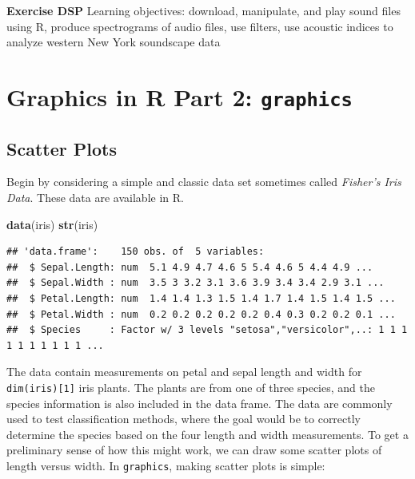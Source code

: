 \documentclass[
]{krantz}
\newenvironment{Shaded}{\begin{snugshade}}{\end{snugshade}}
\newcommand{\DataTypeTok}[1]{\textcolor[rgb]{0.13,0.29,0.53}{#1}}
\newcommand{\KeywordTok}[1]{\textcolor[rgb]{0.13,0.29,0.53}{\textbf{#1}}}
\newcommand{\NormalTok}[1]{#1}
\newcommand{\OperatorTok}[1]{\textcolor[rgb]{0.81,0.36,0.00}{\textbf{#1}}}
\begin{document}
\textbf{Exercise DSP} Learning objectives: download, manipulate, and play sound files using R, produce spectrograms of audio files, use filters, use acoustic indices to analyze western New York soundscape data

\hypertarget{graphics}{%
\chapter{\texorpdfstring{Graphics in R Part 2: \texttt{graphics}}{Graphics in R Part 2: graphics}}\label{graphics}}

\hypertarget{graphics1}{%
\section{Scatter Plots}\label{graphics1}}

Begin by considering a simple and classic data set sometimes called \emph{Fisher's Iris Data}. These data are available in R.

\begin{Shaded}
\begin{Highlighting}[]
\KeywordTok{data}\NormalTok{(iris)}
\KeywordTok{str}\NormalTok{(iris)}
\end{Highlighting}
\end{Shaded}

\begin{verbatim}
## 'data.frame':    150 obs. of  5 variables:
##  $ Sepal.Length: num  5.1 4.9 4.7 4.6 5 5.4 4.6 5 4.4 4.9 ...
##  $ Sepal.Width : num  3.5 3 3.2 3.1 3.6 3.9 3.4 3.4 2.9 3.1 ...
##  $ Petal.Length: num  1.4 1.4 1.3 1.5 1.4 1.7 1.4 1.5 1.4 1.5 ...
##  $ Petal.Width : num  0.2 0.2 0.2 0.2 0.2 0.4 0.3 0.2 0.2 0.1 ...
##  $ Species     : Factor w/ 3 levels "setosa","versicolor",..: 1 1 1 1 1 1 1 1 1 1 ...
\end{verbatim}

The data contain measurements on petal and sepal length and width for \texttt{dim(iris){[}1{]}} iris plants. The plants are from one of three species, and the species information is also included in the data frame. The data are commonly used to test classification methods, where the goal would be to correctly determine the species based on the four length and width measurements. To get a preliminary sense of how this might work, we can draw some scatter plots of length versus width. In \texttt{graphics}, making scatter plots is simple:

\begin{Shaded}
\end{Shaded}
\end{document}
